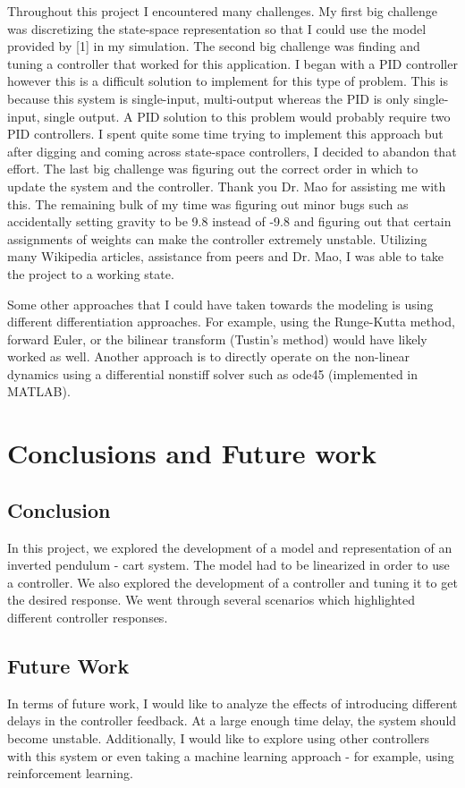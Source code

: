 \documentclass{article}
\begin{document}
Throughout this project I encountered many challenges. My first big challenge was discretizing the state-space representation so that I could use the model provided by [1] in my simulation. The second big challenge was finding and tuning a controller that worked for this application. I began with a PID controller however this is a difficult solution to implement for this type of problem. This is because this system is single-input, multi-output whereas the PID is only single-input, single output. A PID solution to this problem would probably require two PID controllers. I spent quite some time trying to implement this approach but after digging and coming across state-space controllers, I decided to abandon that effort. The last big challenge was figuring out the correct order in which to update the system and the controller. Thank you Dr. Mao for assisting me with this. The remaining bulk of my time was figuring out minor bugs such as accidentally setting gravity to be 9.8 instead of -9.8 and figuring out that certain assignments of weights can make the controller extremely unstable. Utilizing many Wikipedia articles, assistance from peers and Dr. Mao, I was able to take the project to a working state.

Some other approaches that I could have taken towards the modeling is using different differentiation approaches. For example, using the Runge-Kutta method, forward Euler, or the bilinear transform (Tustin's method) would have likely worked as well. Another approach is to directly operate on the non-linear dynamics using a differential nonstiff solver such as ode45 (implemented in MATLAB).

\section{Conclusions and Future work}
\subsection{Conclusion}

In this project, we explored the development of a model and representation of an inverted pendulum - cart system. The model had to be linearized in order to use a controller. We also explored the development of a controller and tuning it to get the desired response. We went through several scenarios which highlighted different controller responses.

\subsection{Future Work}
In terms of future work, I would like to analyze the effects of introducing different delays in the controller feedback. At a large enough time delay, the system should become unstable. Additionally, I would like to explore using other controllers with this system or even taking a machine learning approach - for example, using reinforcement learning. 
\end{document}
